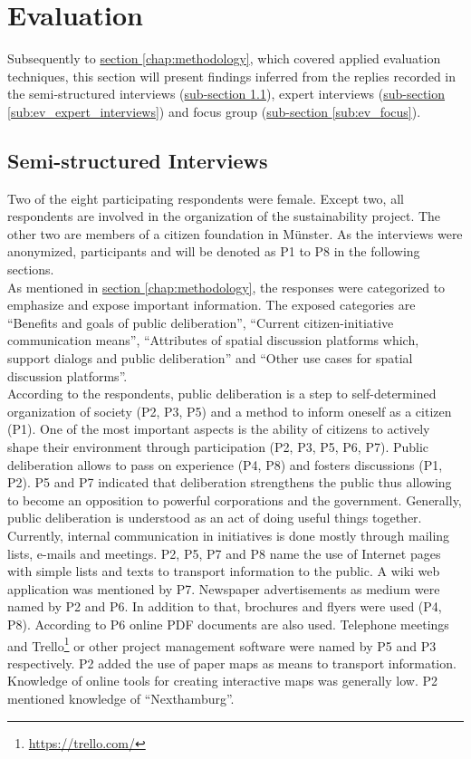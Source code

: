 \section{Evaluation}
\label{chap:evaluation}
Subsequently to \hyperref[chap:methodology]{section \ref{chap:methodology}}, which covered applied evaluation techniques, this section will present findings inferred from the replies recorded in the semi-structured interviews (\hyperref[sub:ev_interviews]{sub-section \ref{sub:ev_interviews}}), expert interviews (\hyperref[sub:ev_expert_interviews]{sub-section \ref{sub:ev_expert_interviews}}) and focus group (\hyperref[sub:ev_focus]{sub-section \ref{sub:ev_focus}}).

\subsection{Semi-structured Interviews}
\label{sub:ev_interviews}
Two of the eight participating respondents were female. Except two, all respondents are involved in the organization of the sustainability project. The other two are members of a citizen foundation in M{\"u}nster. As the interviews were anonymized, participants and will be denoted as P1 to P8 in the following sections.\\
As mentioned in \hyperref[chap:methodology]{section \ref{chap:methodology}}, the responses were categorized to emphasize and expose important information. The exposed categories are ``Benefits and goals of public deliberation'', ``Current citizen-initiative communication means'', ``Attributes of spatial discussion platforms which, support dialogs and public deliberation'' and ``Other use cases for spatial discussion platforms''.\\
According to the respondents, public deliberation is a step to self-determined organization of society (P2, P3, P5) and a method to inform oneself as a citizen (P1). One of the most important aspects is the ability of citizens to actively shape their environment through participation (P2, P3, P5, P6, P7). Public deliberation allows to pass on experience (P4, P8) and fosters discussions (P1, P2). P5 and P7 indicated that deliberation strengthens the public thus allowing to become an opposition to powerful corporations and the government. Generally, public deliberation is understood as an act of doing useful things together.\\
Currently, internal communication in initiatives is done mostly through mailing lists, e-mails and meetings. P2, P5, P7 and P8 name the use of Internet pages with simple lists and texts to transport information to the public. A wiki web application was mentioned by P7. Newspaper advertisements as medium were named by P2 and P6. In addition to that, brochures and flyers were used (P4, P8). According to P6 online PDF documents are also used. Telephone meetings and Trello\footnote{\url{https://trello.com/}} or other project management software were named by P5 and P3 respectively. P2 added the use of paper maps as means to transport information. Knowledge of online tools for creating interactive maps was generally low.  P2 mentioned knowledge of ``Nexthamburg''.\\
